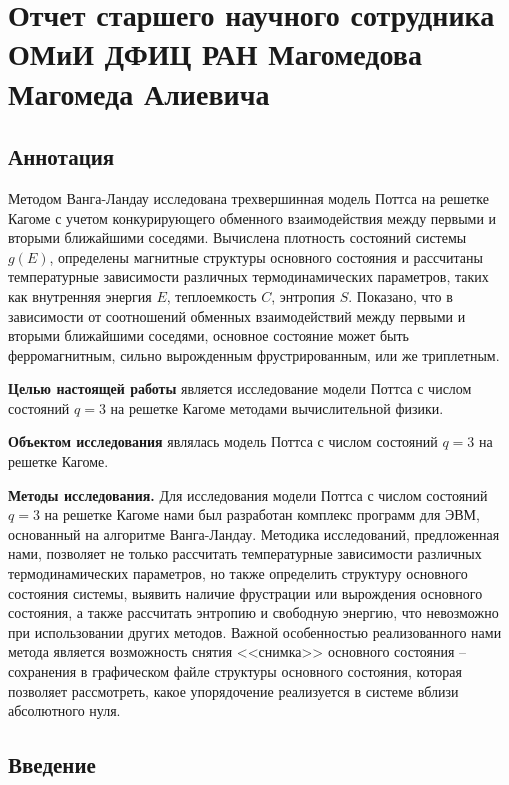 \chapter{Отчет старшего научного сотрудника ОМиИ ДФИЦ РАН
Магомедова Магомеда Алиевича}


\section*{Аннотация}

Методом Ванга-Ландау исследована трехвершинная модель Поттса на решетке Кагоме с учетом конкурирующего обменного взаимодействия между первыми и вторыми ближайшими соседями. Вычислена плотность состояний системы $g(E)$, определены магнитные структуры основного состояния и рассчитаны температурные зависимости различных термодинамических параметров, таких как внутренняя энергия $E$, теплоемкость $C$, энтропия $S$. Показано, что в зависимости от соотношений обменных взаимодействий между первыми и вторыми ближайшими соседями, основное состояние может быть ферромагнитным, сильно вырожденным фрустрированным, или же триплетным.

\textbf{Целью настоящей работы} является исследование модели Поттса с числом состояний $q=3$ на решетке Кагоме методами вычислительной физики.

\textbf{Объектом исследования} являлась модель Поттса с числом состояний $q=3$ на решетке Кагоме.

\textbf{Методы исследования.} Для исследования модели Поттса с числом состояний $q=3$ на решетке Кагоме нами был разработан комплекс программ для ЭВМ, основанный на алгоритме Ванга-Ландау. Методика исследований, предложенная нами, позволяет не только рассчитать температурные зависимости различных термодинамических параметров, но также определить структуру основного состояния системы, выявить наличие фрустрации или вырождения основного состояния, а также рассчитать энтропию и свободную энергию, что невозможно при использовании других методов. Важной особенностью реализованного нами метода является возможность снятия <<снимка>> основного состояния -- сохранения в графическом файле структуры основного состояния, которая позволяет рассмотреть, какое упорядочение реализуется в системе вблизи абсолютного нуля.


\section*{Введение}

